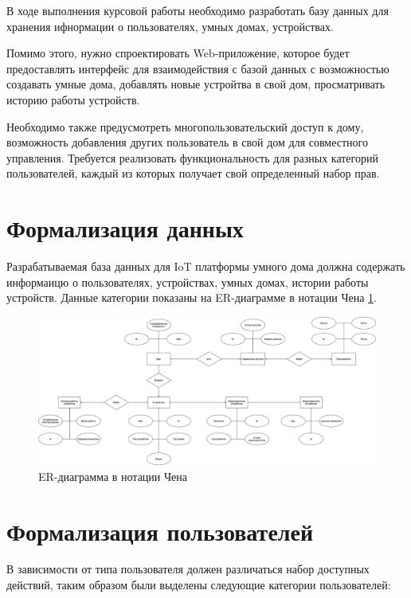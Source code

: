 В ходе выполнения курсовой работы необходимо разработать базу данных для хранения ифнормации 
о пользователях, умных домах, устройствах. 

Помимо этого, нужно спроектировать Web-приложение, 
которое будет предоставлять интерфейс для взаимодействия с базой данных с возможностью создавать умные дома, 
добавлять новые устройтва в свой дом, просматривать историю работы устройств.
    
Необходимо также предусмотреть многопользовательский доступ к дому, возможность добавления других пользователь 
в свой дом для совместного управления. Требуется реализовать функциональность для разных категорий пользователей, 
каждый из которых получает свой определенный набор прав.

\section{Формализация данных}

Разрабатываемая база данных для IoT платформы умного дома должна содержать информаицю о пользователях, устройствах, умных домах,
истории работы устройств. Данные категории показаны на ER-диаграмме в нотации Чена \ref{img:er}.

\begin{figure}[h]
    \includegraphics[width=0.9\linewidth]{img/er.png}
    \caption{ER-диаграмма в нотации Чена}
    \label{img:er}
\end{figure}
\noindent
\clearpage

\section{Формализация пользователей}

В зависимости от типа пользователя должен различаться набор доступных действий, таким 
образом были выделены следующие категории пользователей:

